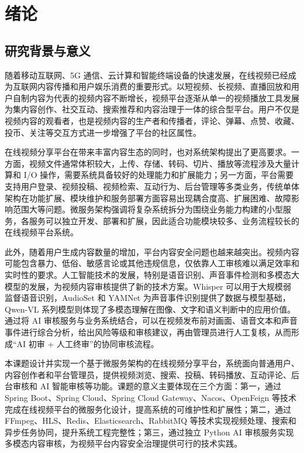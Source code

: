 
\chapter{绪论}

\section{研究背景与意义}

随着移动互联网、5G 通信、云计算和智能终端设备的快速发展，在线视频已经成为互联网内容传播和用户娱乐消费的重要形式。以短视频、长视频、直播回放和用户自制内容为代表的视频内容不断增长，视频平台逐渐从单一的视频播放工具发展为集内容创作、社交互动、搜索推荐和内容治理于一体的综合型平台。用户不仅是视频内容的观看者，也是视频内容的生产者和传播者，评论、弹幕、点赞、收藏、投币、关注等交互方式进一步增强了平台的社区属性。

在线视频分享平台在带来丰富内容生态的同时，也对系统架构提出了更高要求。一方面，视频文件通常体积较大，上传、存储、转码、切片、播放等流程涉及大量计算和 I/O 操作，需要系统具备较好的处理能力和扩展能力；另一方面，平台需要支持用户登录、视频投稿、视频检索、互动行为、后台管理等多类业务，传统单体架构在功能扩展、模块维护和服务部署方面容易出现耦合度高、扩展困难、故障影响范围大等问题。微服务架构强调将复杂系统拆分为围绕业务能力构建的小型服务，各服务可以独立开发、部署和扩展，因此适合功能模块较多、业务流程较长的在线视频平台系统\cite{lewis2014microservices,newman2021building,fielding2000architectural,evans2003ddd,richardson2018microservices}。

此外，随着用户生成内容数量的增加，平台内容安全问题也越来越突出。视频内容可能包含暴力、低俗、敏感言论或其他违规信息，仅依靠人工审核难以满足效率和实时性的要求。人工智能技术的发展，特别是语音识别、声音事件检测和多模态大模型的发展，为视频内容审核提供了新的技术方案。Whisper 可以用于大规模弱监督语音识别，AudioSet 和 YAMNet 为声音事件识别提供了数据与模型基础，Qwen-VL 系列模型则体现了多模态理解在图像、文字和语义判断中的应用价值\cite{radford2023whisper,gemmeke2017audioset,hershey2017cnn,tensorflow2024yamnet,bai2023qwen}。通过将 AI 审核服务与业务系统结合，可以在视频发布前对画面、语音文本和声音事件进行综合分析，给出风险等级和审核建议，再由管理员进行人工复核，从而形成“AI 初审 + 人工终审”的协同审核流程。

本课题设计并实现一个基于微服务架构的在线视频分享平台，系统面向普通用户、内容创作者和平台管理员，提供视频浏览、搜索、投稿、转码播放、互动评论、后台审核和 AI 智能审核等功能。课题的意义主要体现在三个方面：第一，通过 Spring Boot、Spring Cloud、Spring Cloud Gateway、Nacos、OpenFeign 等技术完成在线视频平台的微服务化设计，提高系统的可维护性和扩展性\cite{springframeworkdocs,springbootdocs,springclouddocs,springgatewaydocs,springopenfeign,nacosdocs}；第二，通过 FFmpeg、HLS、Redis、Elasticsearch、RabbitMQ 等技术实现视频处理、搜索和异步任务协同，提升系统工程完整性\cite{ffmpegdocs,rfc8216hls,redisdocs,elasticsearchdocs,rabbitmqdocs}；第三，通过独立 Python AI 审核服务实现多模态内容审核，为视频平台内容安全治理提供可行的技术实践\cite{radford2023whisper,gemmeke2017audioset,hershey2017cnn,tensorflow2024yamnet,bai2023qwen,fastapidocs,uvicorndocs,pikadocs}。

